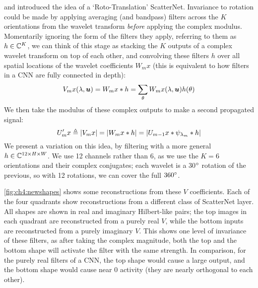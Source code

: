 \cite{sifre_rotation_2013} and \cite{oyallon_deep_2015} introduced the idea of
a `Roto-Translation' ScatterNet. Invariance to rotation could be made by
applying averaging (and bandpass) filters across the $K$ orientations 
from the wavelet transform \emph{before} applying the complex modulus.
Momentarily ignoring the form of the filters they apply, referring to them
as $h\in \complexes[K]$, we can think of this stage as stacking the $K$
outputs of a complex wavelet transform on top of each other, and convolving
these filters $h$ over all spatial locations of the wavelet coefficients $W_m
x$ (this is equivalent to how filters in a CNN are fully connected
in depth):
\begin{equation}
  V_m x(\lambda, \bm{u}) = W_{m}x \conv h = \sum_{\theta} W_{m}x(\lambda, \bm{u})
h(\theta)
\end{equation}
We then take the modulus of these complex outputs to make a second propagated
signal:
\begin{equation}
  U_{m}'x \definedas |V_{m}x| = |W_{m}x \conv h| = |U_{m-1}x
  \conv \psi_{\lambda_{m}} \conv h|
\end{equation}
We present a variation on this idea, by filtering with a more general 
$h\in \complexes[12\x H\x W]$. We use 12 channels rather than 6, as we use
the $K=6$ orientations and their complex conjugates; each wavelet is a 30$\degs$
rotation of the previous, so with 12 rotations, we can cover the full
$360\degs$. 

\autoref{fig:ch4:newshapes} shows some reconstructions from these $V$ coefficients.
Each of the four quadrants show reconstructions from a different class of
ScatterNet layer. 
All shapes are shown in real and imaginary Hilbert-like pairs; the top images in
each quadrant are reconstructed from a purely real $V$, while the bottom inputs
are reconstructed from a purely imaginary $V$. This shows one level of invariance of
these filters, as after taking the complex magnitude, both the top and the
bottom shape will activate the filter with the same strength. In comparison, for
the purely real filters of a CNN, the top shape would cause a large output, and
the bottom shape would cause near 0 activity (they are nearly orthogonal to each
other).

